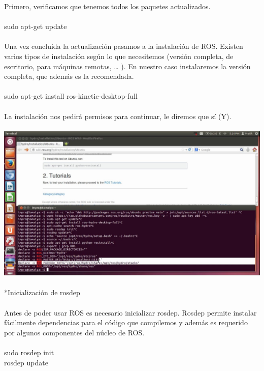 \documentclass[12pt,a4paper]{article}
\begin{document}
Primero, verificamos que tenemos todos los paquetes actualizados.
\\\\
sudo apt-get update
\\\\
Una vez concluida la actualización pasamos a la instalación de ROS. Existen varios tipos de instalación según lo que necesitemos (versión completa, de escritorio, para máquinas remotas, … ). En nuestro caso instalaremos la versión completa, que además es la recomendada.
\\\\
sudo apt-get install ros-kinetic-desktop-full
\\\\
La instalación nos pedirá permisos para continuar, le diremos que sí (Y).
\\\\
\includegraphics[scale=0.3]{maxresdefault.jpg} 
\\\\
*Inicialización de rosdep
\\\\
Antes de poder usar ROS es necesario inicializar rosdep. Rosdep permite instalar fácilmente dependencias para el código que compilemos y además es requerido por algunos componentes del núcleo de ROS.
\\\\
sudo rosdep init \\
rosdep update
\\\\
\end{document}
